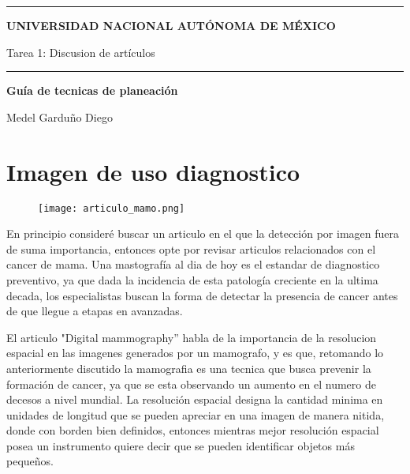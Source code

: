 \documentclass{article}
\begin{document}
\thispagestyle{plain}


\hrule
\begin{center}
    {\Large \textbf{UNIVERSIDAD NACIONAL AUTÓNOMA DE MÉXICO}}
    \vspace{10pt}

    {\Large{{Tarea 1: Discusion de artículos}}}
    
    
    \vspace{10pt}

    \hrule

    \vspace{20pt}


    {\Huge \textbf{Guía de tecnicas de planeación}}\\
\end{center}

\hdashrule{\linewidth}{1pt}{1mm}

\begin{flushright}
    {\small Medel Garduño Diego} 
\end{flushright}



\section{Imagen de uso diagnostico}


\begin{figure}[h!]
    \centering
    \texttt{[image: articulo\_mamo.png]}
\end{figure}

En principio consideré buscar un articulo en el que la detección por imagen fuera de suma importancia, entonces opte por revisar articulos relacionados con el cancer de mama. Una mastografía al dia de hoy es el estandar de diagnostico preventivo, ya que dada la incidencia de esta patología creciente en la ultima decada, los especialistas buscan la forma de detectar la presencia de cancer antes de que llegue a etapas en avanzadas.

\vspace{10pt} 



El articulo "Digital mammography'' habla de la importancia de la resolucion espacial en las imagenes generados por un mamografo, y es que, retomando lo anteriormente discutido la mamografia es una tecnica que busca prevenir la formación de cancer, ya que se esta observando un aumento en el numero de decesos a nivel mundial. La resolución espacial designa la cantidad minima en unidades de longitud que se pueden apreciar en una imagen de manera nitida, donde con borden bien definidos, entonces mientras mejor resolución espacial posea un instrumento quiere decir que se pueden identificar objetos más pequeños. 
\end{document}
